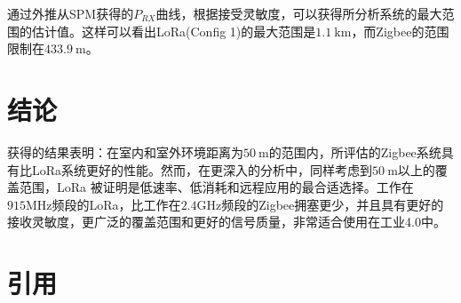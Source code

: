 \documentclass[10pt]{ctexart}
\begin{document}
通过外推从SPM获得的$P_{R X}$曲线，根据接受灵敏度，可以获得所分析系统的最大范围的估计值。这样可以看出LoRa(Config 1)的最大范围是$1.1\mathrm{~km}$，而Zigbee的范围限制在$433.9\mathrm{~m}$。

\section{结论}
获得的结果表明：在室内和室外环境距离为$50\mathrm{~m}$的范围内，所评估的Zigbee系统具有比LoRa系统更好的性能。然而，在更深入的分析中，同样考虑到$50\mathrm{~m}$以上的覆盖范围，LoRa 被证明是低速率、低消耗和远程应用的最合适选择。工作在$915\mathrm{MHz}$频段的LoRa，比工作在$2.4\mathrm{GHz}$频段的Zigbee拥塞更少，并且具有更好的接收灵敏度，更广泛的覆盖范围和更好的信号质量，非常适合使用在工业4.0中。

\section{引用}
\end{document}
